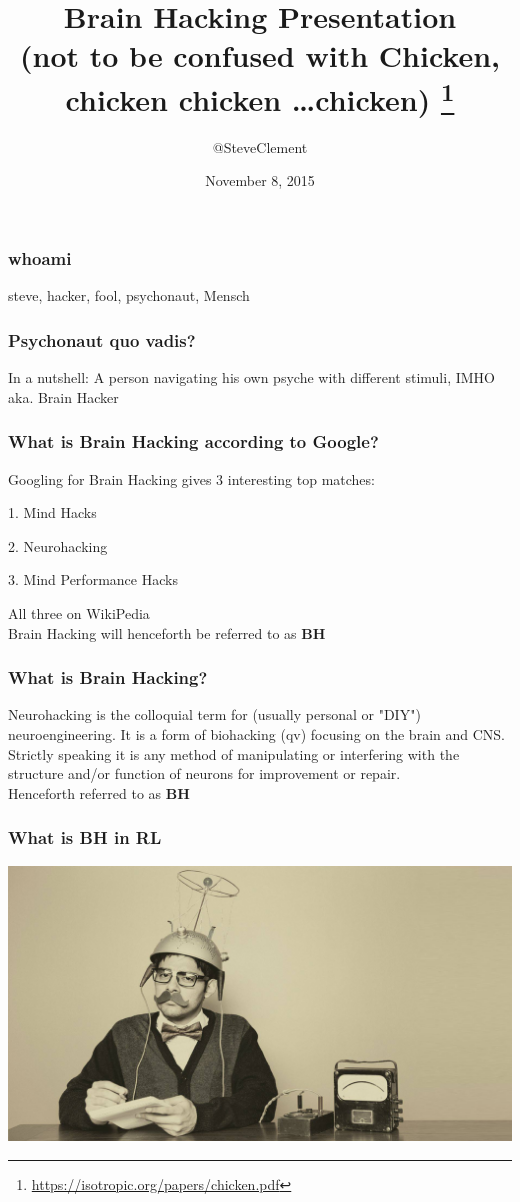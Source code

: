 \documentclass[a4paper]{beamer}
\begin{document}
\title{Brain Hacking Presentation\\(not to be confused with Chicken, chicken chicken \ldots  chicken) \footnote{\url{https://isotropic.org/papers/chicken.pdf}}}
\author{@SteveClement}
\date{November 8, 2015}


\frame{\titlepage}

\begin{frame}
\frametitle{whoami}
steve, hacker, fool, psychonaut, Mensch
\end{frame}

\begin{frame}
\frametitle{Psychonaut quo vadis?}
In a nutshell: A person navigating his own psyche with different stimuli, IMHO aka. Brain Hacker
\end{frame}

\begin{frame}
\frametitle{What is Brain Hacking according to Google?}

Googling for Brain Hacking gives 3 interesting top matches:

1. Mind Hacks

2. Neurohacking

3. Mind Performance Hacks

All three on WikiPedia
\\
Brain Hacking will henceforth be referred to as {\bf BH}
\end{frame}

\begin{frame}
\frametitle{What is Brain Hacking?}
Neurohacking is the colloquial term for (usually personal or "DIY") neuroengineering. It is a form of biohacking (qv) focusing on the brain and CNS. Strictly speaking it is any method of manipulating or interfering with the structure and/or function of neurons for improvement or repair.
\\
Henceforth referred to as {\bf BH}
\end{frame}

\begin{frame}
\frametitle{What is BH in RL}
\begin{center}
\includegraphics[scale=0.20]{img/mindreader3.jpg}
\end{center}
\end{frame}
\end{document}
